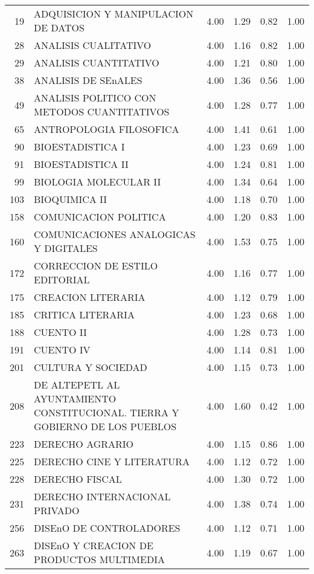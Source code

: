 \begin{table}[ht]
\begin{tabular}{rlrrrr}
  19 & ADQUISICION Y MANIPULACION DE DATOS & 4.00 & 1.29 & 0.82 & 1.00 \\ 
  28 & ANALISIS CUALITATIVO & 4.00 & 1.16 & 0.82 & 1.00 \\ 
  29 & ANALISIS CUANTITATIVO & 4.00 & 1.21 & 0.80 & 1.00 \\ 
  38 & ANALISIS DE SEnALES & 4.00 & 1.36 & 0.56 & 1.00 \\ 
  49 & ANALISIS POLITICO CON METODOS CUANTITATIVOS & 4.00 & 1.28 & 0.77 & 1.00 \\ 
  65 & ANTROPOLOGIA FILOSOFICA & 4.00 & 1.41 & 0.61 & 1.00 \\ 
  90 & BIOESTADISTICA I & 4.00 & 1.23 & 0.69 & 1.00 \\ 
  91 & BIOESTADISTICA II & 4.00 & 1.24 & 0.81 & 1.00 \\ 
  99 & BIOLOGIA MOLECULAR II & 4.00 & 1.34 & 0.64 & 1.00 \\ 
  103 & BIOQUIMICA II & 4.00 & 1.18 & 0.70 & 1.00 \\ 
  158 & COMUNICACION POLITICA & 4.00 & 1.20 & 0.83 & 1.00 \\ 
  160 & COMUNICACIONES ANALOGICAS Y DIGITALES & 4.00 & 1.53 & 0.75 & 1.00 \\ 
  172 & CORRECCION DE ESTILO EDITORIAL & 4.00 & 1.16 & 0.77 & 1.00 \\ 
  175 & CREACION LITERARIA & 4.00 & 1.12 & 0.79 & 1.00 \\ 
  185 & CRITICA LITERARIA & 4.00 & 1.23 & 0.68 & 1.00 \\ 
  188 & CUENTO II & 4.00 & 1.28 & 0.73 & 1.00 \\ 
  191 & CUENTO IV & 4.00 & 1.14 & 0.81 & 1.00 \\ 
  201 & CULTURA Y SOCIEDAD & 4.00 & 1.15 & 0.73 & 1.00 \\ 
  208 & DE ALTEPETL AL AYUNTAMIENTO CONSTITUCIONAL. TIERRA Y GOBIERNO DE LOS PUEBLOS & 4.00 & 1.60 & 0.42 & 1.00 \\ 
  223 & DERECHO AGRARIO & 4.00 & 1.15 & 0.86 & 1.00 \\ 
  225 & DERECHO CINE Y LITERATURA & 4.00 & 1.12 & 0.72 & 1.00 \\ 
  228 & DERECHO FISCAL & 4.00 & 1.30 & 0.72 & 1.00 \\ 
  231 & DERECHO INTERNACIONAL PRIVADO & 4.00 & 1.38 & 0.74 & 1.00 \\ 
  256 & DISEnO DE CONTROLADORES & 4.00 & 1.12 & 0.71 & 1.00 \\ 
  263 & DISEnO Y CREACION DE PRODUCTOS MULTIMEDIA & 4.00 & 1.19 & 0.67 & 1.00 \\ 

\end{tabular}
\end{table}
